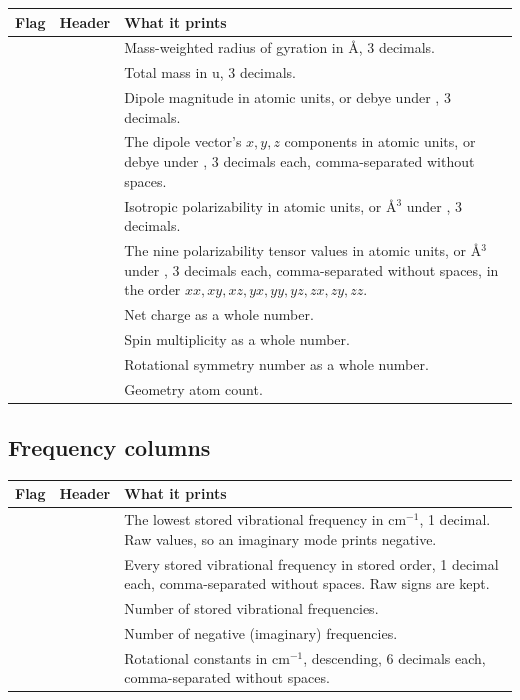 \begin{longtable}{@{}L{2.9cm}L{2.5cm}L{7.8cm}@{}}
\toprule
\textbf{Flag} & \textbf{Header} & \textbf{What it prints} \\
\midrule
\endhead
{} &  & Mass-weighted radius of gyration in \AA{}, 3
decimals. \\
 &  & Total mass in u, 3 decimals. \\
 &  & Dipole magnitude in atomic units, or debye under
, 3 decimals. \\
 &  & The dipole vector's $x,y,z$ components in atomic
units, or debye under , 3 decimals each, comma-separated
without spaces. \\
 &  & Isotropic polarizability in atomic units, or
\AA$^3$ under , 3 decimals. \\
 &  & The nine polarizability tensor values in atomic
units, or \AA$^3$ under , 3 decimals each, comma-separated
without spaces, in the order $xx, xy, xz, yx, yy, yz, zx, zy, zz$. \\
 &  & Net charge as a whole number. \\
 &  & Spin multiplicity as a whole
number. \\
 &  & Rotational symmetry number as a whole number. \\
 &  & Geometry atom count. \\
\bottomrule
\end{longtable}

\subsection{Frequency columns}\label{sec:frequency-columns}

\begin{longtable}{@{}L{2.9cm}L{2.5cm}L{7.8cm}@{}}
\toprule
\textbf{Flag} & \textbf{Header} & \textbf{What it prints} \\
\midrule
\endhead
{} &  & The lowest stored vibrational frequency in
cm$^{-1}$, 1 decimal. Raw values, so an imaginary mode prints negative. \\
 &  & Every stored vibrational frequency in stored
order, 1 decimal each, comma-separated without spaces. Raw signs are kept. \\
 &  & Number of stored vibrational frequencies. \\
 &  & Number of negative (imaginary) frequencies. \\
 &  & Rotational constants in cm$^{-1}$, descending,
6 decimals each, comma-separated without spaces. \\
\bottomrule
\end{longtable}

